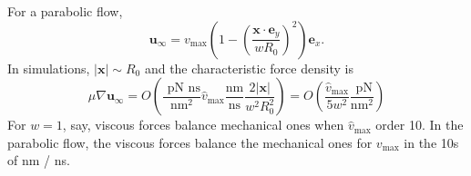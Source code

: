 \documentclass[12pt,letterpaper, onecolumn]{article}
\begin{document}
For a parabolic flow, 
\begin{equation}
\mathbf{u}_{\infty} = v_{\max}\left( 1 - \left( \frac{\mathbf{x} \cdot \mathbf{e}_y}{w R_0} \right)^2 \right)\mathbf{e}_x.
\end{equation}
In simulations, $|\mathbf{x}| \sim R_0$ and 
the characteristic force density is 
\begin{equation}
\mu \nabla \mathbf{u}_{\infty} 
= O\left(\frac{\text{ pN ns}}{\text{nm}^{2}}  \hat v_{\max}\frac{ \text{nm}}{ \text{ns}}\frac{2|\mathbf{x}|}{w^2R_0^2}\right)
= O\left(\frac{\hat{v}_{\max}}{5w^2}\frac{\text{ pN}}{\text{nm}^{2}} \right)
\end{equation}
For $w = 1$, say, viscous forces balance mechanical ones when $\hat{v}_{\max}$ order 10.  In the parabolic flow, the 
viscous forces balance the mechanical ones for $v_{\max}$ in the 10s of nm / ns.
\end{document}
